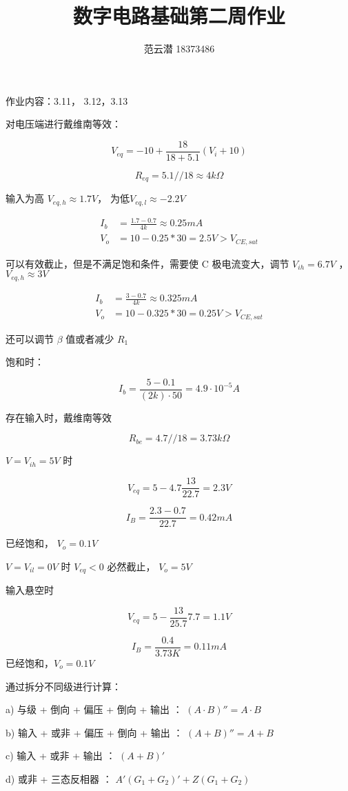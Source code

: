 \documentclass[lang=cn,11pt,a4paper,cite=authoryear]{elegantpaper}
\title{数字电路基础\quad 第二周作业}
\author{范云潜 18373486}
\institute{微电子学院 184111 班}
\date{\zhtoday}
\begin{document}
\maketitle

作业内容：3.11， 3.12，3.13


对电压端进行戴维南等效：

\[V_{eq} = -10 + \frac{18}{18 + 5.1}(V_i + 10)\]

\[R_{eq} = 5.1 // 18 \approx 4 k\Omega\] 

输入为高 \(V_{eq,h} \approx 1.7V\)， 为低\(V_{eq,l} \approx -2.2V\)

\[\begin{aligned}
    I_b &= \frac{1.7 - 0.7}{4 k} \approx 0.25 mA \\
    V_o &= 10 - 0.25 * 30 = 2.5 V > V_{CE,sat}
\end{aligned}\]

可以有效截止，但是不满足饱和条件，需要使 C 极电流变大，调节 \(V_{ih} = 6.7 V\) ， \(V_{eq,h} \approx 3V\)

\[\begin{aligned}
    I_b &= \frac{3 - 0.7}{4 k} \approx 0.325 mA \\
    V_o &= 10 - 0.325 * 30 = 0.25 V > V_{CE,sat}
\end{aligned}\]

还可以调节 \(\beta\) 值或者减少 \(R_1\)


饱和时：

\[I_b = \frac{5-0.1}{(2k)\cdot 50} = 4.9 \cdot 10^{-5} A\]

存在输入时，戴维南等效

\[R_{be} = 4.7 // 18 = 3.73 k\Omega\]

\(V = V_{ih} = 5V\) 时 

\[V_{eq} = 5 - 4.7 \frac{13}{22.7} = 2.3V\]

\[I_B = \frac{2.3 - 0.7}{22.7} = 0.42 mA\]

已经饱和， \(V_o = 0.1 V\)

\(V = V_{il} = 0V\) 时 \(V_{eq} < 0 \) 必然截止， \(V_o = 5V\)

输入悬空时 

\[V_{eq} = 5 - \frac{13}{25.7}7.7 = 1.1 V\] 

\[I_B = \frac{0.4}{3.73 K} = 0.11 mA\] 已经饱和，\(V_o = 0.1V\)


通过拆分不同级进行计算：

a) 与级 + 倒向 + 偏压 + 倒向 + 输出 ： \((A \cdot B)'' = A \cdot B\)

b) 输入 + 或非 + 偏压 + 倒向 + 输出 ： \((A + B)'' = A + B\)

c) 输入 + 或非 + 输出 ： \((A + B)'\)

d) 或非 + 三态反相器 ： \(A' (G_1 + G_2)' + Z (G_1 + G_2)\)


\end{document}
